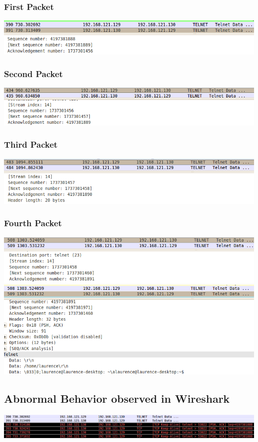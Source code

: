 \documentclass[12pt]{article}
\begin{document}
\subsubsection{First Packet}
\includegraphics[width=160mm]{task41.png}
\subsubsection{Second Packet}
\includegraphics[width=160mm]{task42.png}
\subsubsection{Third Packet}
\includegraphics[width=160mm]{task43.png}
\subsubsection{Fourth Packet}
\includegraphics[width=160mm]{task44.png}
\includegraphics[width=160mm]{task45.png}

\subsection{Abnormal Behavior observed in Wireshark}
\includegraphics[width=160mm]{task46.png}
\end{document}
